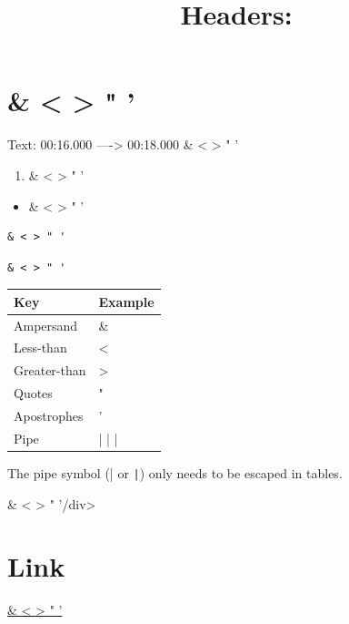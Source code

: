 \documentclass[11pt,a4paper]{article}
\title{Headers:}
\begin{document}
\maketitle

\section{\& < > " '}

Text: 00:16.000 ----> 00:18.000 \& < > " '

\begin{enumerate}
\item \& < > " '
\end{enumerate}

\begin{itemize}
\item \& < > " '
\end{itemize}

\begin{verbatim}
& < > " '
\end{verbatim}

\begin{verbatim}
& < > " '
\end{verbatim}

\begin{table}[h]
\begin{tabular}{|l|l|}
\hline
Key & Example \\ \hline
Ampersand & \& \\ \hline
Less-than & < \\ \hline
Greater-than & > \\ \hline
Quotes & " \\ \hline
Apostrophes & ' \\ \hline
Pipe & | | | \\ \hline
\end{tabular}
\end{table}

The pipe symbol (| or \texttt{|}) only needs to be escaped in tables.

\& < > " '/div>

\section{Link}

\href{https://en.wikipedia.org/wiki/Albert\_Einstein}{\& < > " '}
\end{document}
